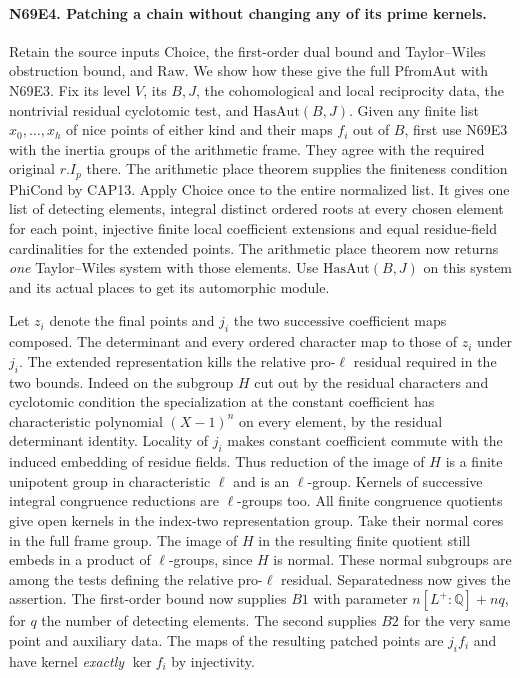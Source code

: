 \paragraph{N69E4. Patching a chain without changing any of its prime kernels.}
Retain the source inputs $\mathrm{Choice}$, the
first-order dual bound and Taylor--Wiles obstruction bound, and
$\mathrm{Raw}$. We show how these give the full
$\mathrm{PfromAut}$ with N69E3. Fix its level $V$, its $B,J$,
the cohomological and local reciprocity data, the nontrivial residual
cyclotomic test, and $\mathrm{HasAut}(B,J)$. Given any finite list
$x_0,\ldots,x_h$ of nice points of either kind and their maps $f_i$
out of $B$, first use N69E3 with the inertia groups of the
arithmetic frame. They agree with the required original $r.I_p$
there. The arithmetic place theorem supplies the finiteness
condition $\mathrm{PhiCond}$ by CAP13. Apply $\mathrm{Choice}$ once to
the entire normalized list. It gives one list of detecting elements,
integral distinct ordered roots at every chosen element for each
point, injective finite local coefficient extensions and equal
residue-field cardinalities for the extended points. The arithmetic
place theorem now returns \emph{one} Taylor--Wiles system with those
elements. Use $\mathrm{HasAut}(B,J)$ on this system and its actual
places to get its automorphic module.

Let $z_i$ denote the final points and $j_i$ the two successive
coefficient maps composed. The determinant and every ordered
character map to those of $z_i$ under $j_i$. The extended
representation kills the relative pro-$\ell$ residual required
in the two bounds. Indeed on the subgroup $H$ cut out by the
residual characters and cyclotomic condition the specialization
at the constant coefficient has characteristic polynomial
$(X-1)^n$ on every element, by the residual determinant identity.
Locality of $j_i$ makes constant coefficient commute with the
induced embedding of residue fields. Thus reduction of the image
of $H$ is a finite unipotent group in characteristic $\ell$
and is an $\ell$-group. Kernels of successive integral congruence
reductions are $\ell$-groups too. All finite congruence quotients
give open kernels in the index-two representation group. Take
their normal cores in the full frame group. The image of $H$ in
the resulting finite quotient still embeds in a product of
$\ell$-groups, since $H$ is normal. These normal subgroups are
among the tests defining the relative pro-$\ell$ residual.
Separatedness now gives the assertion.
The first-order bound now supplies $B1$ with parameter
$n[L^+:\mathbb Q]+nq$, for $q$ the number of detecting elements.
The second supplies $B2$ for the very same point and auxiliary data.
The maps of the resulting patched points are $j_i f_i$ and have
kernel \emph{exactly} $\ker f_i$ by injectivity.

